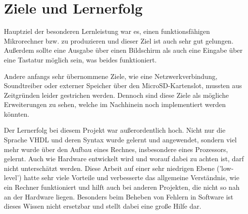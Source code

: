 \section{Ziele und Lernerfolg}
Hauptziel der besonderen Lernleistung war es, einen funktionsfähigen
Mikrorechner bzw. zu produzieren und dieser Ziel ist auch sehr gut gelungen.
Außerdem sollte eine Ausgabe über einen Bildschirm als auch eine Eingabe über
eine Tastatur möglich sein, was beides funktioniert.

Andere anfangs sehr übernommene Ziele, wie eine Netzwerkverbindung, Soundtreiber
oder externer Speicher über den MicroSD-Kartenslot, mussten aus Zeitgründen
leider gestrichen werden. Dennoch sind diese Ziele als mögliche Erweiterungen zu
sehen, welche im Nachhinein noch implementiert werden könnten.

Der Lernerfolg bei diesem Projekt war außerordentlich hoch. Nicht nur die
Sprache VHDL und deren Syntax wurde gelernt und angewendet, sondern viel mehr
wurde über den Aufbau eines Rechnes, insbesondere eines Prozessors, gelernt.
Auch wie Hardware entwickelt wird und worauf dabei zu achten ist, darf nicht
unterschätzt werden. Diese Arbeit auf einer sehr niedrigen Ebene ('low-level')
hatte sehr viele Vorteile und verbesserte das allgemeine Verständnis, wie ein
Rechner funktioniert und hilft auch bei anderen Projekten, die nicht so nah an
der Hardware liegen. Besonders beim Beheben von Fehlern in Software ist dieses
Wissen nicht ersetzbar und stellt dabei eine große Hilfe dar.
\pagebreak
